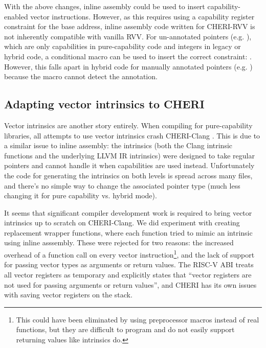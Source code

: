 \documentclass[../thesis]{subfiles}
\begin{document}
With the above changes, inline assembly could be used to insert capability-enabled vector instructions.
However, as this requires using a capability register constraint for the base address, inline assembly code written for CHERI-RVV is not inherently compatible with vanilla RVV.
For un-annotated pointers (e.g. ), which are only capabilities in pure-capability code and integers in legacy or hybrid code, a conditional macro can be used to insert the correct constraint: .
However, this falls apart in hybrid code for manually annotated pointers (e.g. ) because the macro cannot detect the annotation.


\subsection{Adapting vector intrinsics to CHERI}
Vector intrinsics are another story entirely.
When compiling for pure-capability libraries, all attempts to use vector intrinsics crash CHERI-Clang .
This is due to a similar issue to inline assembly: the intrinsics (both the Clang intrinsic functions and the underlying LLVM IR intrinsics) were designed to take regular pointers and cannot handle it when capabilities are used instead.
Unfortunately the code for generating the intrinsics on both levels is spread across many files, and there's no simple way to change the associated pointer type (much less changing it for pure capability vs. hybrid mode).

It seems that significant compiler development work is required to bring vector intrinsics up to scratch on CHERI-Clang.
We did experiment with creating replacement wrapper functions, where each function tried to mimic an intrinsic using inline asssembly.
These were rejected for two reasons: the increased overhead of a function call on every vector instruction\footnote{This could have been eliminated by using preprocessor macros instead of real functions, but they are difficult to program and do not easily support returning values like intrinsics do.}, and the lack of support for passing vector types as arguments or return values.
The RISC-V ABI treats all vector registers as temporary and explicitly states that \enquote{vector registers are not used for passing arguments or return values}\cite{specification-RISCV-ABI-v1.0rc2}, and CHERI has its own issues with saving vector registers on the stack.
\end{document}
